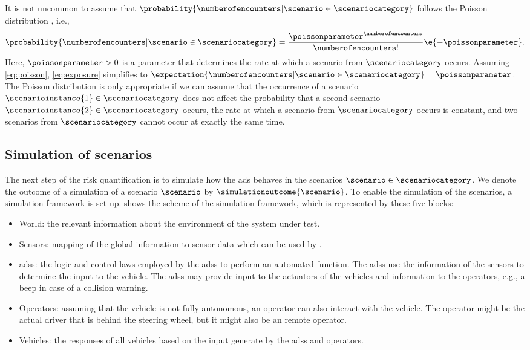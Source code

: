 \begin{remark}
	It is not uncommon to assume that $\probability{\numberofencounters|\scenario\in\scenariocategory}$ follows the Poisson distribution \autocite{nicholson1993accidents, wachenfeld2017new, gyllenhammar2020towards}, i.e., 
	\begin{equation}
		\label{eq:poisson}
		\probability{\numberofencounters|\scenario\in\scenariocategory} = 
		\frac{\poissonparameter^{\numberofencounters}}{\numberofencounters!} \e{-\poissonparameter}.
	\end{equation}
	Here, $\poissonparameter>0$ is a parameter that determines the rate at which a scenario from $\scenariocategory$ occurs.
	Assuming \cref{eq:poisson}, \cref{eq:exposure} simplifies to $\expectation{\numberofencounters|\scenario\in\scenariocategory}=\poissonparameter$.
	The Poisson distribution is only appropriate if we can assume that the occurrence of a scenario $\scenarioinstance{1}\in\scenariocategory$ does not affect the probability that a second scenario $\scenarioinstance{2}\in\scenariocategory$ occurs, the rate at which a scenario from $\scenariocategory$ occurs is constant, and two scenarios from $\scenariocategory$ cannot occur at exactly the same time.
\end{remark}



\subsection{Simulation of scenarios}
\label{sec:simulation}

The next step of the risk quantification is to simulate how the \ac{ads} behaves in the scenarios $\scenario\in\scenariocategory$. 
We denote the outcome of a simulation of a scenario $\scenario$ by $\simulationoutcome{\scenario}$.
To enable the simulation of the scenarios, a simulation framework is set up.
 shows the scheme of the simulation framework, which is represented by these five blocks:
\begin{itemize}
	\item World: the relevant information about the environment of the system under test.
	\item Sensors: mapping of the global information to sensor data which can be used by . 
	\item \acp{ads}: the logic and control laws employed by the \acp{ads} to perform an automated function.
	The \acp{ads} use the information of the sensors to determine the input to the vehicle.
	The \acp{ads} may provide input to the actuators of the vehicles and information to the operators, e.g., a beep in case of a collision warning.
	\item Operators: assuming that the vehicle is not fully autonomous, an operator can also interact with the vehicle.
	The operator might be the actual driver that is behind the steering wheel, but it might also be an remote operator.
	\item Vehicles: the responses of all vehicles based on the input generate by the \acp{ads} and operators.
\end{itemize}

